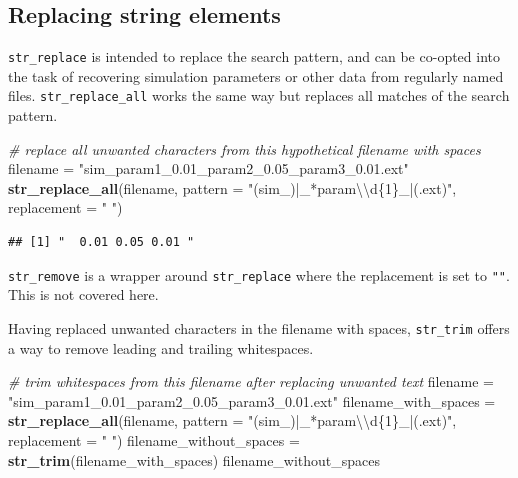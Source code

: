 \documentclass[]{book}
\newenvironment{Shaded}{}{}
\newcommand{\CharTok}[1]{\textcolor[rgb]{0.25,0.44,0.63}{#1}}
\newcommand{\CommentTok}[1]{\textcolor[rgb]{0.38,0.63,0.69}{\textit{#1}}}
\newcommand{\DataTypeTok}[1]{\textcolor[rgb]{0.56,0.13,0.00}{#1}}
\newcommand{\KeywordTok}[1]{\textcolor[rgb]{0.00,0.44,0.13}{\textbf{#1}}}
\newcommand{\NormalTok}[1]{#1}
\newcommand{\StringTok}[1]{\textcolor[rgb]{0.25,0.44,0.63}{#1}}
\begin{document}
\hypertarget{replacing-string-elements}{%
\subsection{Replacing string elements}\label{replacing-string-elements}}

\texttt{str\_replace} is intended to replace the search pattern, and can be co-opted into the task of recovering simulation parameters or other data from regularly named files. \texttt{str\_replace\_all} works the same way but replaces all matches of the search pattern.

\begin{Shaded}
\begin{Highlighting}[]
\CommentTok{# replace all unwanted characters from this hypothetical filename with spaces}
\NormalTok{filename =}\StringTok{ "sim_param1_0.01_param2_0.05_param3_0.01.ext"}
\KeywordTok{str_replace_all}\NormalTok{(filename,}
            \DataTypeTok{pattern =} \StringTok{"(sim_)|_*param}\CharTok{\textbackslash{}\textbackslash{}}\StringTok{d\{1\}_|(.ext)"}\NormalTok{,}
            \DataTypeTok{replacement =} \StringTok{" "}\NormalTok{)}
\end{Highlighting}
\end{Shaded}

\begin{verbatim}
## [1] "  0.01 0.05 0.01 "
\end{verbatim}

\texttt{str\_remove} is a wrapper around \texttt{str\_replace} where the replacement is set to \texttt{""}. This is not covered here.

Having replaced unwanted characters in the filename with spaces, \texttt{str\_trim} offers a way to remove leading and trailing whitespaces.

\begin{Shaded}
\begin{Highlighting}[]
\CommentTok{# trim whitespaces from this filename after replacing unwanted text}
\NormalTok{filename =}\StringTok{ "sim_param1_0.01_param2_0.05_param3_0.01.ext"}
\NormalTok{filename_with_spaces =}\StringTok{ }\KeywordTok{str_replace_all}\NormalTok{(filename,}
                                       \DataTypeTok{pattern =} \StringTok{"(sim_)|_*param}\CharTok{\textbackslash{}\textbackslash{}}\StringTok{d\{1\}_|(.ext)"}\NormalTok{,}
                                       \DataTypeTok{replacement =} \StringTok{" "}\NormalTok{)}
\NormalTok{filename_without_spaces =}\StringTok{ }\KeywordTok{str_trim}\NormalTok{(filename_with_spaces)}
\NormalTok{filename_without_spaces}
\end{Highlighting}
\end{Shaded}
\end{document}

